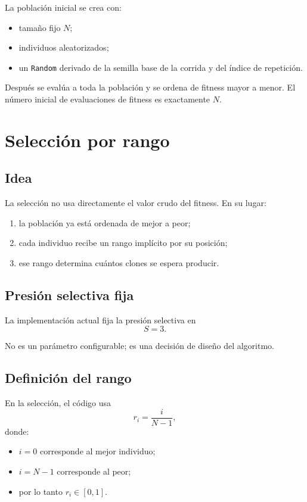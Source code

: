 \documentclass[11pt]{article}
\begin{document}
La poblaci\'on inicial se crea con:

\begin{itemize}
  \item tama\~no fijo \(N\);
  \item individuos aleatorizados;
  \item un \texttt{Random} derivado de la semilla base de la corrida y del
  \'indice de repetici\'on.
\end{itemize}

Despu\'es se eval\'ua a toda la poblaci\'on y se ordena de fitness mayor a
menor. El n\'umero inicial de evaluaciones de fitness es exactamente \(N\).

\section{Selecci\'on por rango}

\subsection{Idea}

La selecci\'on no usa directamente el valor crudo del fitness. En su lugar:

\begin{enumerate}
  \item la poblaci\'on ya est\'a ordenada de mejor a peor;
  \item cada individuo recibe un rango impl\'icito por su posici\'on;
  \item ese rango determina cu\'antos clones se espera producir.
\end{enumerate}

\subsection{Presi\'on selectiva fija}

La implementaci\'on actual fija la presi\'on selectiva en
\[
S = 3.
\]

No es un par\'ametro configurable; es una decisi\'on de dise\~no del algoritmo.

\subsection{Definici\'on del rango}

En la selecci\'on, el c\'odigo usa
\[
r_i = \frac{i}{N-1},
\]
donde:

\begin{itemize}
  \item \(i=0\) corresponde al mejor individuo;
  \item \(i=N-1\) corresponde al peor;
  \item por lo tanto \(r_i \in [0,1]\).
\end{itemize}
\end{document}

